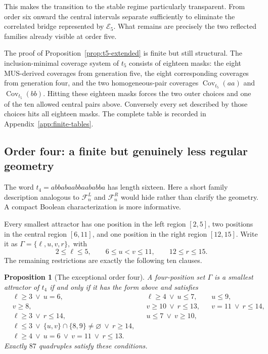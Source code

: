 \documentclass[10pt,a4paper]{article}
\newtheorem{proposition}[theorem]{Proposition}
\theoremstyle{definition}\newtheorem{definition}[theorem]{Definition}
\theoremstyle{remark}\newtheorem{remark}[theorem]{Remark}
\newcommand{\Cov}{\operatorname{Cov}}
\newcommand{\FL}{\mathcal{F}^{L}}
\newcommand{\FR}{\mathcal{F}^{R}}
\begin{document}
This makes the transition to the stable regime particularly transparent.  From order six onward the central intervals separate sufficiently to eliminate the correlated bridge represented by $\mathcal E_5$.  What remains are precisely the two reflected families already visible at order five.

The proof of Proposition~\ref{prop:t5-extended} is finite but still structural.  The inclusion-minimal coverage system of $t_5$ consists of eighteen masks: the eight MUS-derived coverages from generation five, the eight corresponding coverages from generation four, and the two homogeneous-pair coverages $\Cov_{t_5}(aa)$ and $\Cov_{t_5}(bb)$.  Hitting these eighteen masks forces the two outer choices and one of the ten allowed central pairs above.  Conversely every set described by those choices hits all eighteen masks.  The complete table is recorded in Appendix~\ref{app:finite-tables}.

\subsection{Order four: a finite but genuinely less regular geometry}
\label{subsec:t4-exceptional}

The word
$
 t_4=abbabaabbaababba
$
has length sixteen.  Here a short family description analogous to $\FL_n$ and $\FR_n$ would hide rather than clarify the geometry.  A compact Boolean characterization is more informative.

Every smallest attractor has one position in the left region $[2,5]$, two positions in the central region $[6,11]$, and one position in the right region $[12,15]$.  Write it as
$
 \Gamma=\{\ell,u,v,r\},
$
with
\[
 2\le\ell\le5,
 \qquad
 6\le u<v\le11,
 \qquad
 12\le r\le15.
\]
The remaining restrictions are exactly the following ten clauses.

\begin{proposition}[The exceptional order four]
\label{prop:t4-extended}
A four-position set $\Gamma$ is a smallest attractor of $t_4$ if and only if it has the form above and satisfies
\begin{align*}
 &\ell\ge3\ \lor\ u=6,
 &&\ell\ge4\ \lor\ u\le7,
 &&u\le9,\\
 &v\ge8,
 &&v\ge10\ \lor\ r\le13,
 &&v=11\ \lor\ r\le14,\\
 &\ell\ge3\ \lor\ r\le14,
 &&u\le7\ \lor\ v\ge10,\\
 &\ell\le3\ \lor\ \{u,v\}\cap\{8,9\}\ne\varnothing\ \lor\ r\ge14,\\
 &\ell\ge4\ \lor\ u=6\ \lor\ v=11\ \lor\ r\le13.
\end{align*}
Exactly $87$ quadruples satisfy these conditions.
\end{proposition}
\end{document}
